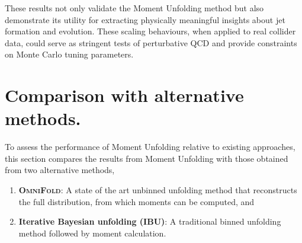             These results not only validate the Moment Unfolding method but also demonstrate its utility for extracting physically meaningful insights about jet formation and evolution.
            These scaling behaviours, when applied to real collider data, could serve as stringent tests of perturbative QCD and provide constraints on Monte Carlo tuning parameters.
            
\section{Comparison with alternative methods.}
    To assess the performance of Moment Unfolding relative to existing approaches, this section compares the results from Moment Unfolding with those obtained from two alternative methods,
    \begin{enumerate}
        \item \textbf{\textsc{OmniFold}}: A state of the art unbinned unfolding method that reconstructs the full distribution, from which moments can be computed, and 
        \item \textbf{Iterative Bayesian unfolding (IBU)}: A traditional binned unfolding method followed by moment calculation.
    \end{enumerate}
